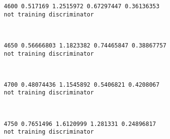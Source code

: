 \documentclass[11pt]{article}
\begin{document}
    \begin{Verbatim}[commandchars=\\\{\}]
4600 0.517169 1.2515972 0.67297447 0.36136353
not training discriminator

    \end{Verbatim}

    \begin{center}
    \end{center}
    { \hspace*{\fill} \\}
    
    \begin{Verbatim}[commandchars=\\\{\}]
4650 0.56666803 1.1823382 0.74465847 0.38867757
not training discriminator

    \end{Verbatim}

    \begin{center}
    \end{center}
    { \hspace*{\fill} \\}
    
    \begin{Verbatim}[commandchars=\\\{\}]
4700 0.48074436 1.1545892 0.5406821 0.4208067
not training discriminator

    \end{Verbatim}

    \begin{center}
    \end{center}
    { \hspace*{\fill} \\}
    
    \begin{Verbatim}[commandchars=\\\{\}]
4750 0.7651496 1.6120999 1.281331 0.24896817
not training discriminator

    \end{Verbatim}

    \begin{center}
    \end{center}
    { \hspace*{\fill} \\}
    
\end{document}
